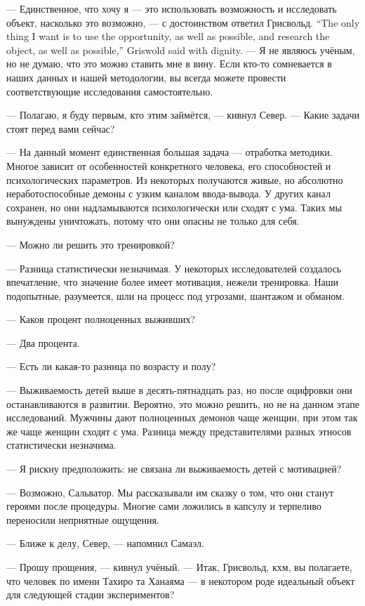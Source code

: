 {--- Единственное, что хочу я --- это использовать возможность и исследовать объект, насколько это возможно, --- с достоинством ответил Грисвольд.}
{``The only thing I want is to use the opportunity, as well as possible, and research the object, as well as possible,'' Griswold said with dignity.}
--- Я не являюсь учёным, но не думаю, что это можно ставить мне в вину.
Если кто-то сомневается в наших данных и нашей методологии, вы всегда можете провести соответствующие исследования самостоятельно.

--- Полагаю, я буду первым, кто этим займётся, --- кивнул Север.
--- Какие задачи стоят перед вами сейчас?

--- На данный момент единственная большая задача --- отработка методики.
Многое зависит от особенностей конкретного человека, его способностей и психологических параметров.
Из некоторых получаются живые, но абсолютно неработоспособные демоны с узким каналом ввода-вывода.
У других канал сохранен, но они надламываются психологически или сходят с ума.
Таких мы вынуждены уничтожать, потому что они опасны не только для себя.

--- Можно ли решить это тренировкой?

--- Разница статистически незначимая.
У некоторых исследователей создалось впечатление, что значение более имеет мотивация, нежели тренировка.
Наши подопытные, разумеется, шли на процесс под угрозами, шантажом и обманом.

--- Каков процент полноценных выживших?

--- Два процента.

--- Есть ли какая-то разница по возрасту и полу?

--- Выживаемость детей выше в десять-пятнадцать раз, но после оцифровки они останавливаются в развитии.
Вероятно, это можно решить, но не на данном этапе исследований.
Мужчины дают полноценных демонов чаще женщин, при этом так же чаще женщин сходят с ума.
Разница между представителями разных этносов статистически незначима.

--- Я рискну предположить: не связана ли выживаемость детей с мотивацией?

--- Возможно, Сальватор.
Мы рассказывали им сказку о том, что они станут героями после процедуры.
Многие сами ложились в капсулу и терпеливо переносили неприятные ощущения.

--- Ближе к делу, Север, --- напомнил Самаэл.

--- Прошу прощения, --- кивнул учёный.
--- Итак, Грисвольд, кхм, вы полагаете, что человек по имени Тахиро та Ханаяма --- в некотором роде идеальный объект для следующей стадии экспериментов?

